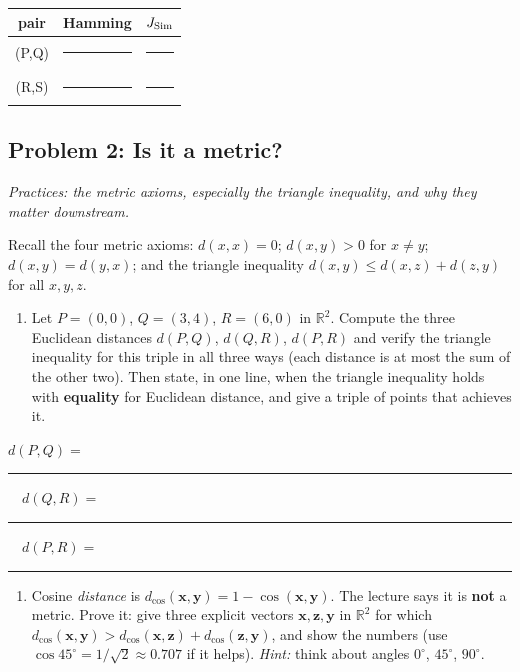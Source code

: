 \documentclass[
  11pt,
]{article}
\newcounter{none} %
\providecommand{\tightlist}{%
  \setlength{\itemsep}{0pt}\setlength{\parskip}{0pt}}
\newcommand{\answerspace}[1]{\par\vspace*{#1}}  %
\newcommand{\blank}[1][1.2in]{\rule{#1}{0.4pt}}
\newcommand{\answerpage}{\clearpage}
\begin{document}
{\def\LTcaptype{none} %
\begin{longtable}[]{@{}ccc@{}}
\toprule\noalign{}
pair & Hamming & \(J_{\rm Sim}\) \\
\midrule\noalign{}
\endhead
\bottomrule\noalign{}
\endlastfoot
(P,Q) & \blank[0.8in] & \blank[0.8in] \\
(R,S) & \blank[0.8in] & \blank[0.8in] \\
\end{longtable}
}

\answerspace{1.8in}

\answerpage

\subsection{Problem 2: Is it a metric?}\label{problem-2-is-it-a-metric}

\emph{Practices: the metric axioms, especially the triangle inequality,
and why they matter downstream.}

Recall the four metric axioms: \(d(x,x)=0\); \(d(x,y)>0\) for
\(x\ne y\); \(d(x,y)=d(y,x)\); and the triangle inequality
\(d(x,y)\le d(x,z)+d(z,y)\) for all \(x,y,z\).

\begin{enumerate}
\def\labelenumi{(\alph{enumi})}
\tightlist
\item
  Let \(P=(0,0)\), \(Q=(3,4)\), \(R=(6,0)\) in \(\mathbb{R}^2\). Compute
  the three Euclidean distances \(d(P,Q)\), \(d(Q,R)\), \(d(P,R)\) and
  verify the triangle inequality for this triple in all three ways (each
  distance is at most the sum of the other two). Then state, in one
  line, when the triangle inequality holds with \textbf{equality} for
  Euclidean distance, and give a triple of points that achieves it.
\end{enumerate}

\(d(P,Q) =\) \blank[0.7in] \(\quad d(Q,R) =\)
\blank[0.7in] \(\quad d(P,R) =\) \blank[0.7in]

\answerspace{1.9in}

\begin{enumerate}
\def\labelenumi{(\alph{enumi})}
\setcounter{enumi}{1}
\tightlist
\item
  Cosine \emph{distance} is
  \(d_{\cos}(\mathbf{x},\mathbf{y}) = 1 - \cos(\mathbf{x},\mathbf{y})\).
  The lecture says it is \textbf{not} a metric. Prove it: give three
  explicit vectors \(\mathbf{x},\mathbf{z},\mathbf{y}\) in
  \(\mathbb{R}^2\) for which
  \(d_{\cos}(\mathbf{x},\mathbf{y}) > d_{\cos}(\mathbf{x},\mathbf{z}) + d_{\cos}(\mathbf{z},\mathbf{y})\),
  and show the numbers (use \(\cos 45^\circ = 1/\sqrt2 \approx 0.707\)
  if it helps). \emph{Hint:} think about angles \(0^\circ\),
  \(45^\circ\), \(90^\circ\).
\end{enumerate}
\end{document}
